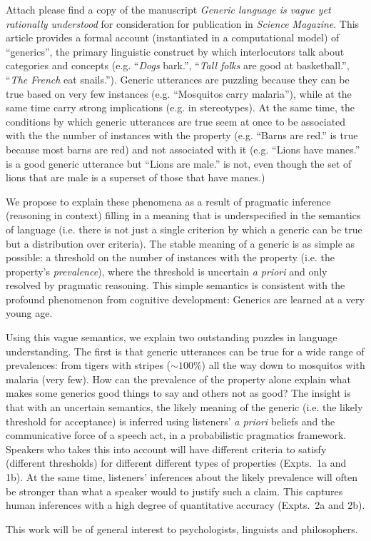 \documentclass[10pt,stdletter,dateno,sigleft]{newlfm} %
\begin{document}
\begin{newlfm}


Attach please find a copy of the manuscript \emph{Generic language is vague yet rationally understood} for consideration for publication in \emph{Science Magazine}. This article provides a formal account (instantiated in a computational model) of ``generics'', the primary linguistic construct by which interlocutors talk about categories and concepts (e.g. ``\emph{Dogs} bark.'', ``\emph{Tall folks} are good at basketball.'', ``\emph{The French} eat snails.'').  Generic utterances are puzzling because they can be true based on very few instances (e.g. ``Mosquitos carry malaria''), while at the same time carry strong implications (e.g. in stereotypes). At the same time, the conditions by which generic utterances are true seem at once to be associated with the the number of instances with the property (e.g. ``Barns are red.'' is true because most barns are red) and not associated with it (e.g. ``Lions have manes.'' is a good generic utterance but ``Lions are male.'' is not, even though the set of lions that are male is a superset of those that have manes.)

We propose to explain these phenomena as a result of pragmatic inference (reasoning in context) filling in a meaning that is underspecified in the semantics of language (i.e. there is not just a single criterion by which a generic can be true but a distribution over criteria). 
The stable meaning of a generic is as simple as possible: a threshold on the number of instances with the property (i.e. the property's \emph{prevalence}), where the threshold is uncertain \emph{a priori} and only resolved by pragmatic reasoning.
This simple semantics is consistent with the profound phenomenon from cognitive development: Generics are learned at a very young age.

Using this vague semantics, we explain two outstanding puzzles in language understanding. 
The first is that generic utterances can be true for a wide range of prevalences: from tigers with stripes ($\sim 100\%$) all the way down to mosquitos with malaria (very few). 
How can the prevalence of the property alone explain what makes some generics good things to say and others not as good? 
The insight is that with an uncertain semantics, the likely meaning of the generic (i.e. the likely threshold for acceptance) is inferred using listeners' \emph{a priori} beliefs and the communicative force of a speech act, in a probabilistic pragmatics framework. Speakers who takes this into account will have different criteria to satisfy (different thresholds) for different different types of properties (Expts.~1a and 1b). At the same time, listeners' inferences about the likely prevalence will often be stronger than what a speaker would to justify such a claim. This captures human inferences with a high degree of quantitative accuracy (Expts.~2a and 2b). 

This work will be of general interest to psychologists, linguists and philosophers.


\end{newlfm}
\end{document}
